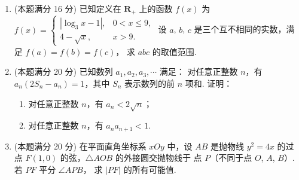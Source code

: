 \documentclass{chsmc}
\begin{document}
\begin{enumerate}[resume]
  \item (本题满分 16 分) 已知定义在 $\mathbf{R}_+$ 上的函数 $f(x)$ 为
    $f(x) = \begin{cases}
      |\log_3 x - 1|, & 0 < x \leqslant 9, \\
      4 - \sqrt{x}, & x > 9.
    \end{cases}$
    设 $a$, $b$, $c$ 是三个互不相同的实数，满足 $f(a) = f(b) = f(c)$，
    求 $abc$ 的取值范围.
  \item (本题满分 20 分) 已知数列 $a_1, a_2, a_3, \cdots$ 满足：
    对任意正整数 $n$，有 $a_n(2S_n - a_n) = 1$，其中 $S_n$ 表示数列的前 $n$ 项和.
    证明：
    \begin{enumerate}[(1)]
      \item 对任意正整数 $n$，有 $a_n < 2\sqrt{n}$；
      \item 对任意正整数 $n$，有 $a_n a_{n+1} < 1$.
    \end{enumerate}
  \item (本题满分 20 分) 在平面直角坐标系 $xOy$ 中，设 $AB$ 是抛物线
    $y^2 = 4x$ 的过点 $F(1,0)$ 的弦，$\triangle AOB$ 的外接圆交抛物线于
    点 $P$（不同于点 $O$, $A$, $B$）. 若 $PF$ 平分 $\angle APB$，
    求 $|PF|$ 的所有可能值.
\end{enumerate}
\end{document}
